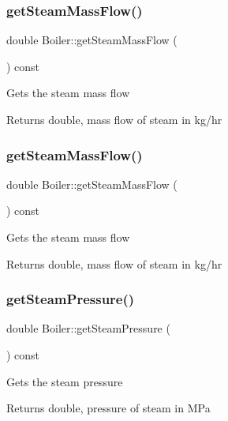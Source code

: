 \subsubsection{\texorpdfstring{get\+Steam\+Mass\+Flow()}{getSteamMassFlow()}\hspace{0.1cm}{\footnotesize\ttfamily [2/3]}}
{\footnotesize\ttfamily double Boiler\+::get\+Steam\+Mass\+Flow (\begin{DoxyParamCaption}{ }\end{DoxyParamCaption}) const}

Gets the steam mass flow \begin{DoxyReturn}{Returns}
double, mass flow of steam in kg/hr 
\end{DoxyReturn}
\mbox{\label{class_boiler_a4101e71234995558a451dcab145b5fc9}} 
\subsubsection{\texorpdfstring{get\+Steam\+Mass\+Flow()}{getSteamMassFlow()}\hspace{0.1cm}{\footnotesize\ttfamily [3/3]}}
{\footnotesize\ttfamily double Boiler\+::get\+Steam\+Mass\+Flow (\begin{DoxyParamCaption}{ }\end{DoxyParamCaption}) const}

Gets the steam mass flow \begin{DoxyReturn}{Returns}
double, mass flow of steam in kg/hr 
\end{DoxyReturn}
\mbox{\label{class_boiler_a99d4bbace6ef20bcbdc4b0cfcdc43213}} 
\subsubsection{\texorpdfstring{get\+Steam\+Pressure()}{getSteamPressure()}\hspace{0.1cm}{\footnotesize\ttfamily [1/3]}}
{\footnotesize\ttfamily double Boiler\+::get\+Steam\+Pressure (\begin{DoxyParamCaption}{ }\end{DoxyParamCaption}) const}

Gets the steam pressure \begin{DoxyReturn}{Returns}
double, pressure of steam in M\+Pa 
\end{DoxyReturn}
\mbox{\label{class_boiler_a99d4bbace6ef20bcbdc4b0cfcdc43213}} 
